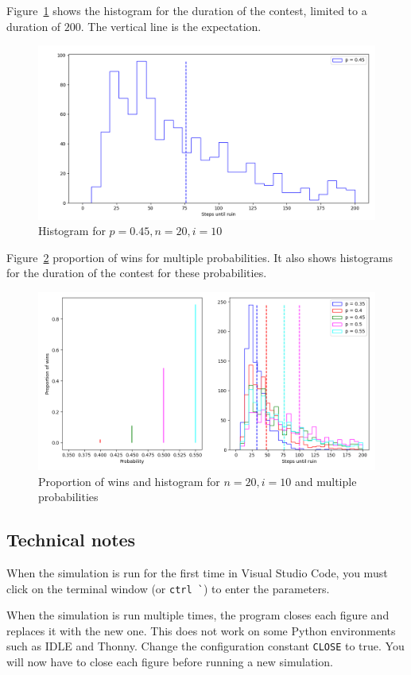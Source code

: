 Figure~\ref{f.gambler-hist1} shows the histogram for the duration of the contest, limited to a duration of $200$. The vertical line is the expectation.
\begin{figure}
\begin{center}
\includegraphics[width=\textwidth]{gamblers_ruin-01}
\end{center}
\caption{Histogram for $p=0.45, n=20, i=10$}\label{f.gambler-hist1}
\end{figure}

Figure~\ref{f.gambler-hist2} proportion of wins for multiple probabilities. It also shows histograms for the duration of the contest for these probabilities. 
\begin{figure}
\begin{center}
\includegraphics[width=\textwidth]{gamblers_ruin-02}
\end{center}
\caption{Proportion of wins and histogram for $n=20, i=10$ and multiple probabilities}\label{f.gambler-hist2}
\end{figure}

\subsection{Technical notes}

When the simulation is run for the first time in Visual Studio Code, you must click on the terminal window (or \verb+ctrl `+) to enter the parameters.

When the simulation is run multiple times, the program closes each figure and replaces it with the new one. This does not work on some Python environments such as IDLE and Thonny. Change the configuration constant \verb+CLOSE+ to true. You will now have to close each figure before running a new simulation.
